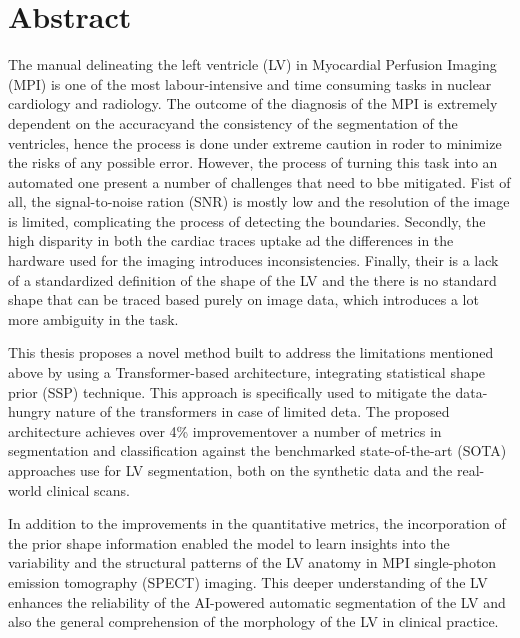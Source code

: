 \chapter*{Abstract}

The manual delineating the left ventricle (LV) in Myocardial Perfusion Imaging (MPI) is one of the most labour-intensive and time consuming tasks in nuclear cardiology and radiology. The outcome of the diagnosis of the MPI is extremely dependent on the accuracyand the consistency of the segmentation of the ventricles, hence the process is done under extreme caution in roder to minimize the risks of any possible error. However, the process of turning this task into an automated one present a number of challenges that need to bbe mitigated. Fist of all, the signal-to-noise ration (SNR) is mostly low and the resolution of the image is limited, complicating the process of detecting the boundaries. Secondly, the high disparity in both the cardiac traces uptake ad the differences in the hardware used for the imaging introduces inconsistencies. Finally, their is a lack of a standardized definition of the shape of the LV and the there is no standard shape that can be traced based purely on image data, which introduces a lot more ambiguity in the task.

This thesis proposes a novel method built to address the limitations mentioned above by using a Transformer-based architecture, integrating statistical shape prior (SSP) technique. This approach is specifically used to mitigate the data-hungry nature of the transformers in case of limited deta. The proposed architecture achieves over 4\% improvementover a number of metrics in segmentation and classification against the benchmarked state-of-the-art (SOTA) approaches use for LV segmentation, both on the synthetic data and the real-world clinical scans.

In addition to the improvements in the quantitative metrics, the incorporation of the prior shape information enabled the model to learn insights into the variability and the structural patterns of the LV anatomy in MPI single-photon emission tomography (SPECT) imaging. This deeper understanding of the LV enhances the reliability of the AI-powered automatic segmentation of the LV and also the general comprehension of the morphology of the LV in clinical practice.
